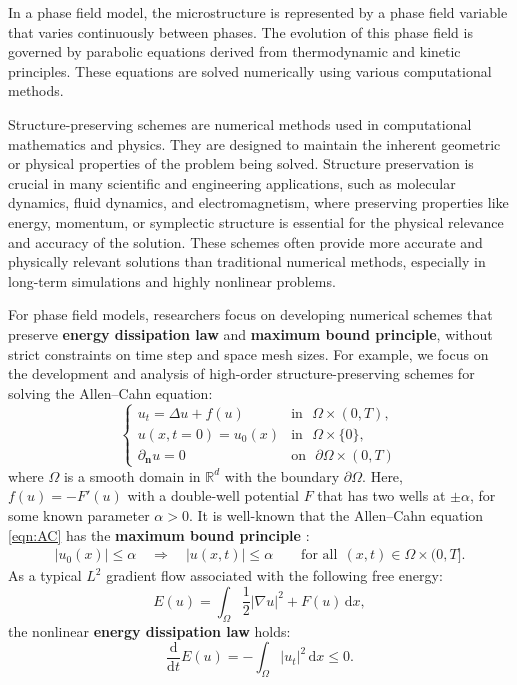 \documentclass[a4paper, oneside]{book}
\def\d{{\mathrm{d}}}
\def\d{\mathrm{d}}
\begin{document}
In a phase field model, the microstructure is represented by a phase field variable that varies continuously between phases. The evolution of this phase field is governed by parabolic equations derived from thermodynamic and kinetic principles. These equations are solved numerically using various computational methods.


Structure-preserving schemes are numerical methods used in computational mathematics and physics. They are designed to maintain the inherent geometric or physical properties of the problem being solved. Structure preservation is crucial in many scientific and engineering applications, such as molecular dynamics, fluid dynamics, and electromagnetism, where preserving properties like energy, momentum, or symplectic structure is essential for the physical relevance and accuracy of the solution. These schemes often provide more accurate and physically relevant solutions than traditional numerical methods, especially in long-term simulations and highly nonlinear problems. 

For phase field models, researchers focus on developing numerical schemes that preserve \textbf{energy dissipation law} and \textbf{maximum bound principle}, without strict constraints on time step and space mesh sizes. For example, we focus on the development and analysis of high-order structure-preserving schemes for solving the Allen--Cahn equation:
\begin{equation}\label{eqn:AC}
    \begin{cases}
    u_t = \Delta u + f(u) &
        \mbox{in~~} \Omega\times(0,T),\\
    u(x,t=0) = u_0(x)   &
        \mbox{in~~} \Omega\times\{0\},\\
    \partial_{\mathbf{n}}u = 0  &
        \mbox{on~~} \partial\Omega\times(0,T)
  \end{cases}
\end{equation}
where $\Omega$ is a smooth domain in $\mathbb{R}^d$ with the boundary $\partial\Omega$. Here, $f(u)=-F'(u)$ with a double-well potential $F$ that has two wells at $\pm\alpha$, for some known parameter $\alpha>0$.
It is well-known that the Allen--Cahn equation \eqref{eqn:AC} has the \textbf{maximum bound principle} \cite{DuJuLiQiao:2020}:
\begin{align}\label{eqn:max-AC}
|u_0(x)|\le \alpha\quad{\Rightarrow}\quad |u(x,t)| \le \alpha\qquad \text{for all} ~~(x,t)\in \Omega\times(0,T].
\end{align}
As a typical $L^2$ gradient flow associated with the following free energy:
$$E(u)=\int_\Omega\frac{1}{2}|\nabla u|^2+F(u)\,\mathrm{d}x,$$
the nonlinear \textbf{energy dissipation law} holds:
\begin{equation}\label{enlaw}
\frac{\d}{\d t}E(u)=-\int_\Omega|u_t|^2\,\mathrm{d}x\le 0.
\end{equation}
\end{document}
